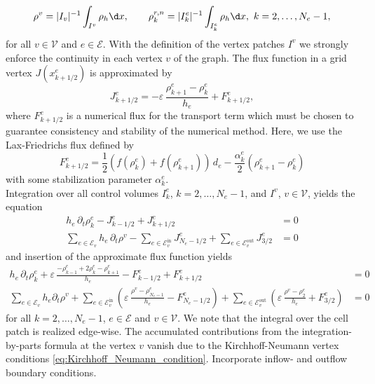 \begin{align*}	
	\rho^{v}= |I_v|^{-1}\int_{I^v}\rho_h\d x, \qquad
	\rho_k^{r,n} = |I_k^e|^{-1}\int_{I_k^e} \rho_h\d x,\ k=2,\ldots,N_e-1,
\end{align*}
for all $v \in \mathcal{V}$ and $e \in \mathcal{E}$. With the definition of the vertex patches $I^v$ we strongly enforce the continuity in each vertex $v$ of the graph. The flux function in a grid vertex $J(x^e_{k+1/2})$ is approximated by
\begin{equation*}
	J_{k+1/2}^e = -\varepsilon\,\frac{\rho_{k+1}^e-\rho_k^e}{h_e}
	+ F^e_{k+1/2},
\end{equation*}
where $F^e_{k+1/2}$ is a numerical flux for the transport term which must be chosen to guarantee consistency and stability of the numerical method. Here, we use the Lax-Friedrichs flux defined by
\begin{equation*}
	F^e_{k+1/2} = \frac{1}{2} (f(\rho_k^e) + f(\rho_{k+1}^e))\,d_e - \frac{\alpha_k^e}2
	(\rho_{k+1}^e - \rho_k^e) 
\end{equation*}
with some stabilization parameter $\alpha_k^e$. \\
Integration over all control volumes $I_k^e$, $k=2,\ldots,N_e-1$, and $I^v$, $v\in \mathcal{V}$, yields the equation
\begin{align*}
	h_e\,\partial_t \rho_k^e - J^e_{k-1/2} + J^e_{k+1/2} &= 0 \\
	\sum_{e\in \mathcal{E}_v} h_e\,\partial_t \rho^v
	- \sum_{e\in \mathcal{E}_v^{\text{in}}} J^e_{N_e-1/2} 
	+ \sum_{e\in \mathcal{E}_v^{\text{out}}} J^e_{3/2} &= 0
\end{align*}
and insertion of the approximate flux function yields
\begin{align*}
	h_e\,\partial_t \rho_k^e + \varepsilon\,\frac{-\rho_{k-1}^e +
	2\rho_k^e - \rho_{k+1}^e}{h_e} - F_{k-1/2}^e + F_{k+1/2}^e &= 0
	  \\
	\sum_{e\in \mathcal{E}_v} h_e\partial_t\rho^v
	+ \sum_{e\in \mathcal{E}_v^{\text{in}}}
	\left(\varepsilon\,\frac{\rho^v-\rho_{N_e-1}^e}{h_e} -
	F^e_{N_e-1/2}\right)
	+ \sum_{e\in \mathcal{E}_v^{\text{out}}}
	\left(\varepsilon\,\frac{\rho^v-\rho_2^e}{h_e} + F^e_{3/2}\right)
	&= 0
\end{align*}
for all $k = 2,\ldots,N_e-1$, $e\in \mathcal{E}$ and $v \in \mathcal{V}$. We note that the integral over the cell patch is realized edge-wise. The accumulated contributions from the integration-by-parts formula at the vertex $v$ vanish due to the Kirchhoff-Neumann vertex conditions \eqref{eq:Kirchhoff_Neumann_condition}. Incorporate inflow- and outflow boundary conditions. \\
